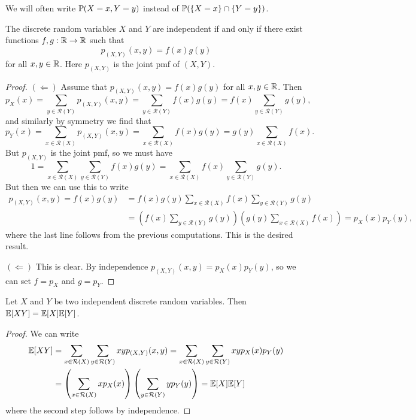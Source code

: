 \begin{remark}
  We will often write
  $\mathbb{P}(X = x, Y = y)$ instead of
  $\mathbb{P}(\{X = x\} \cap \{Y = y\})$.
\end{remark}

\begin{theorem}
  The discrete random variables $X$ and $Y$ are
  independent if and only if there exist functions
  $f, g : \mathbb{R} \to \mathbb{R}$ such that
  \[
    p_{(X, Y)}(x, y) = f(x)g(y)
  \]
  for all $x, y \in \mathbb{R}$. Here $p_{(X, Y)}$ is
  the joint pmf of $(X, Y)$.
\end{theorem}

\begin{proof}
  $(\Leftarrow)$ Assume that
  $p_{(X, Y)}(x, y) = f(x)g(y)$ for all $x, y \in \mathbb{R}$.
  Then
  \[
    p_X(x)
    = \sum_{y \in \mathcal{R}(Y)} p_{(X, Y)}(x, y)
    = \sum_{y \in \mathcal{R}(Y)} f(x) g(y)
    = f(x) \sum_{y \in \mathcal{R}(Y)} g(y),
  \]
  and similarly by symmetry we find that
  \[
    p_Y(x)
    = \sum_{x \in \mathcal{R}(X)} p_{(X, Y)}(x, y)
    = \sum_{x \in \mathcal{R}(X)} f(x) g(y)
    = g(y) \sum_{x \in \mathcal{R}(X)} f(x).
  \]
  But $p_{(X, Y)}$ is the joint pmf, so we must have
  \[
    1 = \sum_{x \in \mathcal{R}(X)} \sum_{y \in \mathcal{R}(Y)} f(x) g(y)
    = \sum_{x \in \mathcal{R}(X)} f(x) \sum_{y \in \mathcal{R}(Y)} g(y).
  \]
  But then we can use this to write
  \begin{align*}
    p_{(X, Y)}(x, y) = f(x) g(y)
    &= f(x) g(y) \sum_{x \in \mathcal{R}(X)} f(x) \sum_{y \in \mathcal{R}(Y)} g(y) \\
    &= \left(f(x) \sum_{y \in \mathcal{R}(Y)} g(y)\right) \left(g(y) \sum_{x \in \mathcal{R}(X)} f(x)\right)
    = p_X(x) p_Y(y),
  \end{align*}
  where the last line follows from the
  previous computations. This is the desired result.

  $(\Leftarrow)$ This is clear. By independence
  $p_{(X, Y)}(x, y) = p_X(x) p_Y(y)$, so we can
  set $f = p_X$ and $g = p_Y$.
\end{proof}

\begin{prop}
  Let $X$ and $Y$ be two independent discrete random
  variables.
  Then $\mathbb{E}[XY] = \mathbb{E}[X] \mathbb{E}[Y]$.
\end{prop}

\begin{proof}
  We can write
  \begin{align*}
    \mathbb{E}[XY]
    &= \sum_{x \in \mathcal{R}(X)} \sum_{y \in \mathcal{R}(Y)} xy p_{(X, Y)}(x, y)
    = \sum_{x \in \mathcal{R}(X)} \sum_{y \in \mathcal{R}(Y)} xy p_X(x) p_Y(y) \\
    &= \left(\sum_{x \in \mathcal{R}(X)} x p_X(x)\right) \left(\sum_{y \in \mathcal{R}(Y)} y p_Y(y)\right)
    = \mathbb{E}[X] \mathbb{E}[Y]
  \end{align*}
  where the second step follows by independence.
\end{proof}

